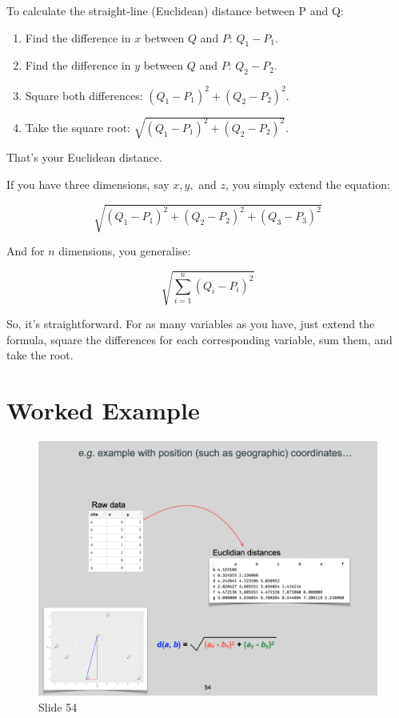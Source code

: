 \documentclass[
  11pt,
]{book}
\providecommand{\tightlist}{%
  \setlength{\itemsep}{0pt}\setlength{\parskip}{0pt}}
\begin{document}
To calculate the straight-line (Euclidean) distance between P and Q:

\begin{enumerate}
\def\labelenumi{\arabic{enumi}.}
\tightlist
\item
  Find the difference in \(x\) between \(Q\) and \(P\): \(Q_1 - P_1\).
\item
  Find the difference in \(y\) between \(Q\) and \(P\): \(Q_2 - P_2\).
\item
  Square both differences: \((Q_1 - P_1)^2 + (Q_2 - P_2)^2\).
\item
  Take the square root: \(\sqrt{(Q_1 - P_1)^2 + (Q_2 - P_2)^2}\).
\end{enumerate}

That's your Euclidean distance.

If you have three dimensions, say \(x, y,\) and \(z\), you simply extend
the equation:

\[
\sqrt{(Q_1 - P_1)^2 + (Q_2 - P_2)^2 + (Q_3 - P_3)^2}
\]

And for \(n\) dimensions, you generalise:

\[
\sqrt{\sum_{i=1}^{n} (Q_i - P_i)^2}
\]

So, it's straightforward. For as many variables as you have, just extend
the formula, square the differences for each corresponding variable, sum
them, and take the root.

\section{Worked Example}\label{worked-example}

\begin{figure}[ht]
\centering
\includegraphics[width=0.8\linewidth]{../images/BDC334/BDC334-054.jpeg}
\caption*{Slide 54}
\end{figure}
\end{document}
